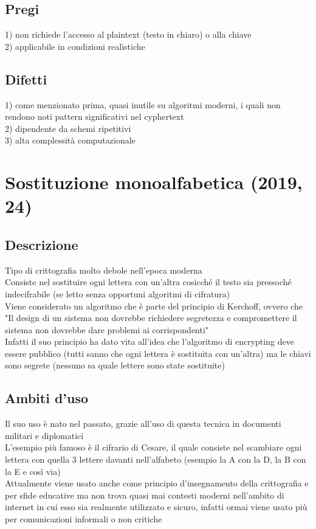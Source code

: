 \documentclass[10pt,oneside,a4paper]{article}
\begin{document}
\subsection{Pregi}
1) non richiede l'accesso al plaintext (testo in chiaro) o alla chiave\\
2) applicabile in condizioni realistiche
\subsection{Difetti}
1) come menzionato prima, quasi inutile su algoritmi moderni, i quali non rendono noti pattern significativi nel cyphertext\\
2) dipendente da schemi ripetitivi\\
3) alta complessità computazionale
\section{Sostituzione monoalfabetica (2019, 24)}
\subsection{Descrizione}
Tipo di crittografia molto debole nell'epoca moderna\\
Consiste nel sostituire ogni lettera con un'altra cosicché il testo sia pressoché indecifrabile (se letto senza opportuni algoritmi di cifratura)\\
Viene considerato un algoritmo che è parte del principio di Kerchoff, ovvero che "Il design di un sistema non dovrebbe richiedere segretezza e compromettere il sistema non dovrebbe dare problemi ai corrispondenti"\\
Infatti il suo principio ha dato vita all'idea che l'algoritmo di encrypting deve essere pubblico (tutti sanno che ogni lettera è sostituita con un'altra) ma le chiavi sono segrete (nessuno sa quale lettere sono state sostituite)
\subsection{Ambiti d'uso}
Il suo uso è nato nel passato, grazie all'uso di questa tecnica in documenti militari e diplomatici\\
L'esempio più famoso è il cifrario di Cesare, il quale consiste nel scambiare ogni lettera con quella 3 lettere davanti nell'alfabeto (esempio la A con la D, la B con la E e così via)\\
Attualmente viene usato anche come principio d'insegnamento della crittografia e per sfide educative ma non trova quasi mai contesti moderni nell'ambito di internet in cui esso sia realmente utilizzato e sicuro, infatti ormai viene usato più per comunicazioni informali o non critiche
\end{document}
